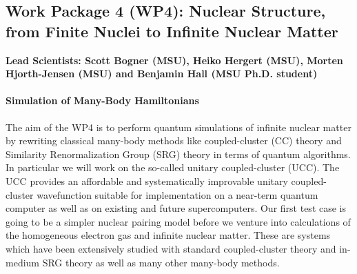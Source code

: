\documentclass[10pt]{article}
\begin{document}
\subsection{Work Package 4 (WP4): Nuclear Structure, from Finite Nuclei to Infinite Nuclear Matter}
{\bf Lead Scientists: Scott Bogner (MSU), Heiko Hergert (MSU), Morten Hjorth-Jensen (MSU) and Benjamin Hall (MSU Ph.D. student)}
\paragraph{Simulation of Many-Body Hamiltonians}

The aim of the WP4 is to perform quantum simulations of infinite nuclear matter by rewriting classical many-body methods like coupled-cluster (CC) theory and Similarity Renormalization Group (SRG) theory in terms of quantum algorithms. In particular we will work on  the so-called unitary coupled-cluster (UCC). The UCC provides an affordable and systematically improvable unitary coupled-cluster wavefunction suitable for implementation on a near-term quantum computer as well as on existing and future supercomputers. Our first test case is going to be a simpler nuclear pairing model before we venture into calculations of the homogeneous electron gas and infinite nuclear matter. These are systems which have been extensively studied with standard coupled-cluster theory and in-medium SRG theory as well as many other many-body methods.  
\end{document}
